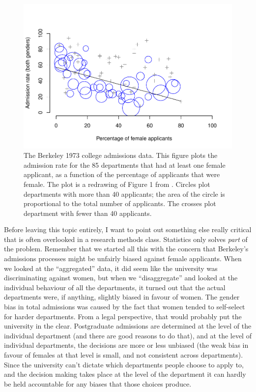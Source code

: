 \documentclass[
]{book}
\begin{document}
\begin{figure}
\centering
\includegraphics{schuster-statistics-remix_files/figure-latex/berkeley-1.pdf}
\caption{\label{fig:berkeley}The Berkeley 1973 college admissions data. This figure plots the admission rate for the 85 departments that had at least one female applicant, as a function of the percentage of applicants that were female. The plot is a redrawing of Figure 1 from \citet{Bickel1975}. Circles plot departments with more than 40 applicants; the area of the circle is proportional to the total number of applicants. The crosses plot department with fewer than 40 applicants.}
\end{figure}

Before leaving this topic entirely, I want to point out something else really critical that is often overlooked in a research methods class. Statistics only solves \emph{part} of the problem. Remember that we started all this with the concern that Berkeley's admissions processes might be unfairly biased against female applicants. When we looked at the ``aggregated'' data, it did seem like the university was discriminating against women, but when we ``disaggregate'' and looked at the individual behaviour of all the departments, it turned out that the actual departments were, if anything, slightly biased in favour of women. The gender bias in total admissions was caused by the fact that women tended to self-select for harder departments. From a legal perspective, that would probably put the university in the clear. Postgraduate admissions are determined at the level of the individual department (and there are good reasons to do that), and at the level of individual departments, the decisions are more or less unbiased (the weak bias in favour of females at that level is small, and not consistent across departments). Since the university can't dictate which departments people choose to apply to, and the decision making takes place at the level of the department it can hardly be held accountable for any biases that those choices produce.
\end{document}
